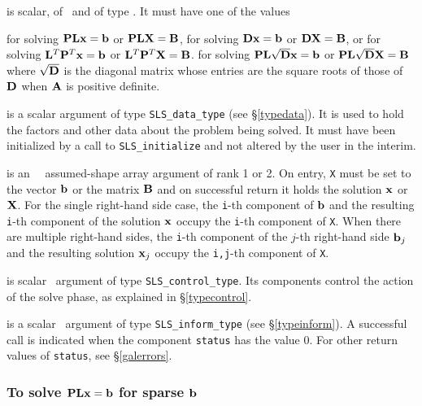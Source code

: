 \documentclass{galahad}
\newcommand{\packagename}{SLS}
\begin{document}
\begin{description}
 is scalar, of \intentin\, and of type \character. It
must have one of the values
\begin{description}
 for solving ${\mathbf{P}} {\mathbf{L}} {\mathbf{x}} =  {\mathbf{b}}$ or
                     ${\mathbf{P}} {\mathbf{L}} {\mathbf{X}} =  {\mathbf{B}}$,
 for solving ${\mathbf{D}} {\mathbf{x}} =  {\mathbf{b}}$ or
                  ${\mathbf{D}} {\mathbf{X}} =  {\mathbf{B}}$, or
 for solving ${\mathbf{L}}^T {\mathbf{P}}^T {\mathbf{x}} =  {\mathbf{b}}$ or
                  ${\mathbf{L}}^T {\mathbf{P}}^T {\mathbf{X}} = {\mathbf{B}}$.
 for solving ${\mathbf{P}} {\mathbf{L}} \sqrt{{\mathbf{D}}} {\mathbf{x}} =  {\mathbf{b}}$ or
                  ${\mathbf{P}} {\mathbf{L}} \sqrt{{\mathbf{D}}} {\mathbf{X}} =  {\mathbf{B}}$
where $\sqrt{{\mathbf{D}}}$ is the diagonal matrix whose entries are the
square roots \hspace*{-4mm} of those of ${\mathbf{D}}$ when ${\mathbf{A}}$ is positive definite.

\end{description}

 is a scalar \intentinout argument of type
{\tt \packagename\_data\_type}
(see \S\ref{typedata}). It is used to hold the factors and other
data about the problem being solved.
It must have been initialized by a call to
{\tt \packagename\_ini\-tialize} and not altered by the user in the interim.

 is an \intentinout\ \realdp\ assumed-shape array argument of rank 1 or 2.
On entry, {\tt X} must be set
to the vector ${\mathbf{b}}$ or the matrix ${\mathbf{B}}$ and on successful return it holds
the solution ${\mathbf{x}}$ or ${\mathbf{X}}$. For the single right-hand side case, the
{\tt i}-th component of ${\mathbf{b}}$ and the resulting
{\tt i}-th component of the solution ${\mathbf{x}}$
occupy the {\tt i}-th component of {\tt X}. When there are multiple
right-hand sides, the
{\tt i}-th component of the $j$-th right-hand side ${\mathbf{b}}_j$
and the resulting solution ${\mathbf{x}}_j$ occupy the
{\tt i,j}-th component of {\tt X}.

 is scalar \intentin\ argument of type
{\tt \packagename\_control\_type}. Its components control the action
of the solve phase, as explained in
\S\ref{typecontrol}.

 is a scalar \intentinout\ argument of type
{\tt \packagename\_inform\_type}
(see \S\ref{typeinform}).
A successful call is indicated when the  component {\tt status} has the value 0.
For other return values of {\tt status}, see \S\ref{galerrors}.

\end{description}

\subsubsection{To solve ${\mathbf{P}} {\mathbf{L}} {\mathbf{x}} =  {\mathbf{b}}$ for sparse ${\mathbf{b}}$}
\label{sparse_solve}
\end{document}
